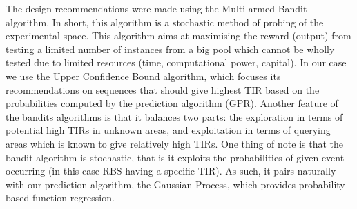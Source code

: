 \documentclass{article}
\begin{document}
The design recommendations were made using the Multi-armed Bandit algorithm.
In short, this algorithm is a stochastic method of probing of the experimental space. 
This algorithm aims at maximising the reward (output) from testing a limited number of instances from a big pool which cannot be wholly tested due to limited resources (time, computational power, capital). 
In our case we use the Upper Confidence Bound algorithm, which focuses its recommendations on sequences that should give highest TIR based on the probabilities computed by the prediction algorithm (GPR). 
Another feature of the bandits algorithms is that it balances two parts: the exploration in terms of potential high TIRs in unknown areas, and exploitation in terms of querying areas which is known to give relatively high TIRs.
One thing of note is that the bandit algorithm is stochastic, that is it exploits the probabilities of given event occurring (in this case RBS having a specific TIR). 
As such, it pairs naturally with our prediction algorithm, the Gaussian Process, which provides probability based function regression.
\end{document}
